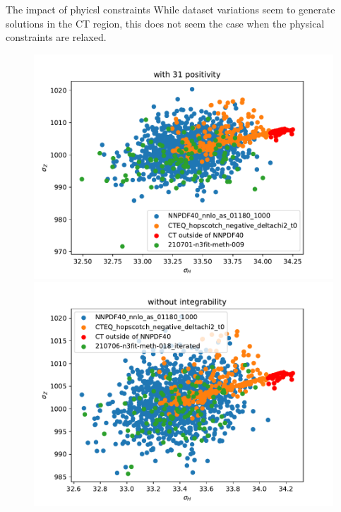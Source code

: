 \documentclass[aspectratio=169,10pt]{beamer}
\begin{document}
\begin{frame}[t]{The impact of phyicsl constraints}
  While dataset variations seem to generate solutions in the CT region, this does not seem the case when the physical constraints are relaxed.
  \begin{figure}
    \centering
    \includegraphics[height=.55\textheight]{with_31_positivity.pdf}
    \includegraphics[height=.55\textheight]{without_integrability.pdf}
  \end{figure}
\end{frame}
\end{document}

